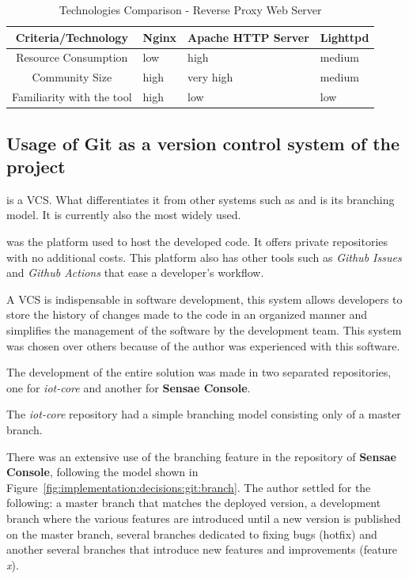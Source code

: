 \begin{table}[H]
    \centering
    \begin{tabular}{@{}clll@{}}
    \toprule
    \textbf{Criteria/Technology} & \textbf{Nginx} & \textbf{Apache HTTP Server} & \textbf{Lighttpd} \\ \midrule
    Resource Consumption      & low  & high      & medium \\ \midrule
    Community Size            & high & very high & medium \\ \midrule
    Familiarity with the tool & high & low       & low    \\ \bottomrule
    \end{tabular}
    \caption{Technologies Comparison - Reverse Proxy Web Server }
    \label{tab:implementation:decisions:nginx:compare}
\end{table}

\subsection{Usage of Git as a version control system of the project}
\label{subsec:implementation:decisions:git}

 is a \gls{VCS}. What differentiates it from other
systems such as  and  is its branching model. It is currently also the most widely used.

 was the platform used to host the developed code. It offers private repositories with no additional costs. This platform also has other tools such as \textit{Github Issues} and \textit{Github Actions} that ease a developer's workflow. 

A \gls{VCS} is indispensable in software development, this system allows developers to store the history of changes made to the code in an organized manner and simplifies the management of the software by the development team. This system was chosen over others because of the author was experienced with this software.

The development of the entire solution was made in two separated repositories, one for \textit{iot-core} and another for \textbf{Sensae Console}.

The \textit{iot-core} repository had a simple branching model consisting only of a master branch. 

There was an extensive use of the branching feature in the repository of \textbf{Sensae Console}, following the model shown in Figure~\ref{fig:implementation:decisions:git:branch}. The author settled for the following: a master branch that matches the deployed version, a development branch where the various features are introduced until a new version is published on the master branch, several branches dedicated to fixing bugs (hotfix) and another several branches that introduce new features and improvements (feature \textit{x}).

